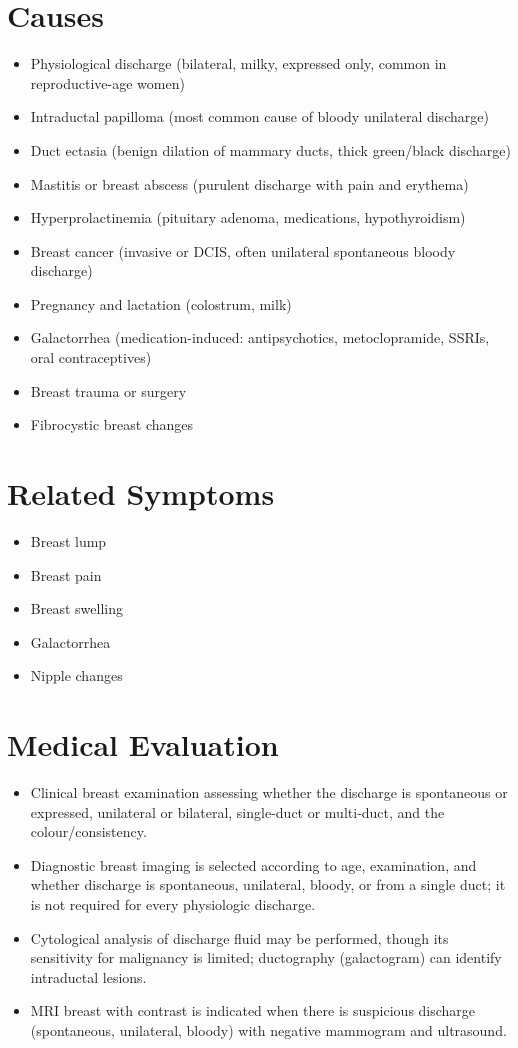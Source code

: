 \section*{Causes}
\begin{itemize}
  \item Physiological discharge (bilateral, milky, expressed only, common in reproductive-age women)
  \item Intraductal papilloma (most common cause of bloody unilateral discharge)
  \item Duct ectasia (benign dilation of mammary ducts, thick green/black discharge)
  \item Mastitis or breast abscess (purulent discharge with pain and erythema)
  \item Hyperprolactinemia (pituitary adenoma, medications, hypothyroidism)
  \item Breast cancer (invasive or DCIS, often unilateral spontaneous bloody discharge)
  \item Pregnancy and lactation (colostrum, milk)
  \item Galactorrhea (medication-induced: antipsychotics, metoclopramide, SSRIs, oral contraceptives)
  \item Breast trauma or surgery
  \item Fibrocystic breast changes
\end{itemize}

\section*{Related Symptoms}
\begin{itemize}
  \item Breast lump
  \item Breast pain
  \item Breast swelling
  \item Galactorrhea
  \item Nipple changes
\end{itemize}

\section*{Medical Evaluation}
\begin{itemize}
  \item Clinical breast examination assessing whether the discharge is spontaneous or expressed, unilateral or bilateral, single-duct or multi-duct, and the colour/consistency.
  \item Diagnostic breast imaging is selected according to age, examination, and whether discharge is spontaneous, unilateral, bloody, or from a single duct; it is not required for every physiologic discharge.
  \item Cytological analysis of discharge fluid may be performed, though its sensitivity for malignancy is limited; ductography (galactogram) can identify intraductal lesions.
  \item MRI breast with contrast is indicated when there is suspicious discharge (spontaneous, unilateral, bloody) with negative mammogram and ultrasound.
\end{itemize}

